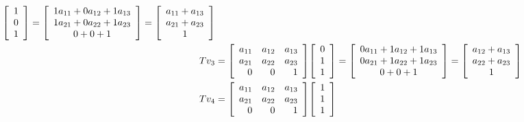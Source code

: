 \documentclass{letter}
\newcommand{\?}{\stackrel{?}{=}}
\newenvironment{Mat}[1]{%
  \left[\begin{array}{*{#1}{r}}
}{%
  \end{array}\right]
}
\newenvironment{Cmat}[1]{%
  \left[\begin{array}{*{#1}{c}}
}{%
  \end{array}\right]
}
\begin{document}
\begin{enumerate}
\begin{enumerate}[label=(\alph*)]
{\begin{align*}
                     \begin{Cmat}{1} 1 \\ 0 \\ 1 \end{Cmat}
                   = \begin{Cmat}{1} 1a_{11} + 0a_{12} + 1a_{13} \\
                                    1a_{21} + 0a_{22} + 1a_{23} \\
                                    0 + 0 + 1 \end{Cmat} 
                   = \begin{Cmat}{1} a_{11}+a_{13} \\ a_{21}+a_{23} \\ 1 \end{Cmat}\\
             Tv_3 &= \begin{Mat}{3} a_{11} & a_{12} & a_{13} \\
                                    a_{21} & a_{22} & a_{23} \\
                                    0      & 0      & 1 \end{Mat}
                     \begin{Cmat}{1} 0 \\ 1 \\ 1 \end{Cmat}
                   = \begin{Cmat}{1} 0a_{11} + 1a_{12} + 1a_{13} \\
                                    0a_{21} + 1a_{22} + 1a_{23} \\
                                    0 + 0 + 1 \end{Cmat} 
                   = \begin{Cmat}{1} a_{12}+a_{13} \\ a_{22}+a_{23} \\ 1 \end{Cmat}\\
             Tv_4 &= \begin{Mat}{3} a_{11} & a_{12} & a_{13} \\
                                    a_{21} & a_{22} & a_{23} \\
                                    0      & 0      & 1 \end{Mat}
                     \begin{Cmat}{1} 1 \\ 1 \\ 1 \end{Cmat}

\end{align*}}
\end{enumerate}
\end{enumerate}
\end{document}

